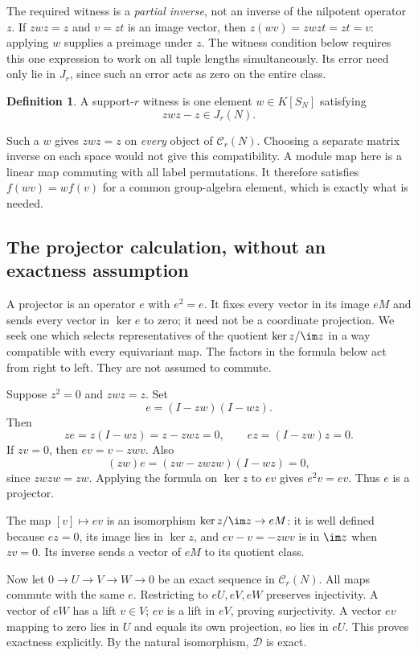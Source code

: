 \documentclass[11pt,a4paper,oneside,openany]{book}
\theoremstyle{definition}\newtheorem{definition}[theorem]{Definition}
\theoremstyle{remark}\newtheorem{remark}[theorem]{Remark}
\newcommand{\D}{\mathcal D}\newcommand{\Del}{\mathcal D}\newcommand{\Lift}{\mathsf L}
\numberwithin{equation}{chapter}
\begin{document}
The required witness is a \emph{partial inverse}, not an inverse of
the nilpotent operator $z$. If $zwz=z$ and $v=zt$ is an image
vector, then $z(wv)=zwzt=zt=v$: applying $w$ supplies a preimage
under $z$. The witness condition below requires this one expression
to work on all tuple lengths simultaneously. Its error need only
lie in $J_r$, since such an error acts as zero on the entire class.

\begin{definition}
A support-$r$ witness is one element $w\in K[S_N]$ satisfying
\begin{equation}\label{tx:eq:witness2}zwz-z\in J_r(N).
\end{equation}
\end{definition}
Such a $w$ gives $zwz=z$ on \emph{every} object of $\mathcal C_r(N)$. Choosing a separate matrix inverse on each space would not give this compatibility. A module map here is a linear map commuting with all label permutations. It therefore satisfies $f(wv)=w f(v)$ for a common group-algebra element, which is exactly what is needed.

\subsection{The projector calculation, without an exactness assumption}
A projector is an operator $e$ with $e^2=e$. It fixes every vector
in its image $eM$ and sends every vector in $\ker e$ to zero;
it need not be a coordinate projection.
We seek one which selects representatives
of the quotient $\ker z/\im z$ in a way compatible with every
equivariant map. The factors in the formula below act from right
to left. They are not assumed to commute.

Suppose $z^2=0$ and $zwz=z$. Set
\[e=(I-zw)(I-wz).\]
Then
\[ze=z(I-wz)=z-zwz=0,\qquad ez=(I-zw)z=0.\]
If $zv=0$, then $ev=v-zwv$. Also
\[(zw)e=(zw-zwzw)(I-wz)=0,\]
since $zwzw=zw$. Applying the formula on $\ker z$ to $ev$ gives $e^2v=ev$. Thus $e$ is a projector.

The map $[v]\mapsto ev$ is an isomorphism $\ker z/\im z\to eM$: it is well defined because $ez=0$, its image lies in $\ker z$, and $ev-v=-zwv$ is in $\im z$ when $zv=0$. Its inverse sends a vector of $eM$ to its quotient class.

Now let $0\to U\to V\to W\to0$ be an exact sequence in $\mathcal C_r(N)$. All maps commute with the same $e$. Restricting to $eU,eV,eW$ preserves injectivity. A vector of $eW$ has a lift $v\in V$; $ev$ is a lift in $eV$, proving surjectivity. A vector $ev$ mapping to zero lies in $U$ and equals its own projection, so lies in $eU$. This proves exactness explicitly. By the natural isomorphism, $\D$ is exact.
\end{document}
